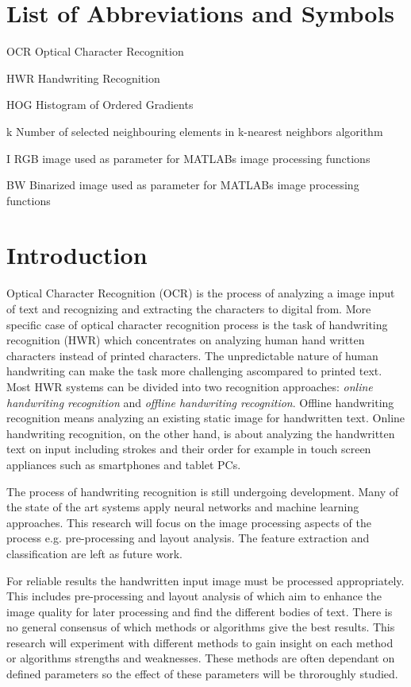 \documentclass{article}
\begin{document}
   \section*{List of Abbreviations and Symbols}

   \begin{abbrv}
    \item[OCR] Optical Character Recognition
    \item[HWR] Handwriting Recognition
    \item[HOG] Histogram of Ordered Gradients
    \item[k] Number of selected neighbouring elements in k-nearest neighbors algorithm
    \item[I] RGB image used as parameter for MATLABs image processing functions
    \item[BW] Binarized image used as parameter for MATLABs image processing functions
   \end{abbrv}

   \newpage
   \section{Introduction}
    Optical Character Recognition (OCR) is the process of analyzing a image input of  text and recognizing and extracting the characters to digital from. More specific case of optical character recognition process is the task of handwriting recognition (HWR) which concentrates on analyzing human hand written characters instead of printed characters. The unpredictable nature of human handwriting can make the task more challenging ascompared to printed text. Most HWR systems can be divided into two recognition approaches: \textit{online handwriting recognition} and \textit{offline handwriting recognition}. Offline handwriting recognition means analyzing an existing static image for handwritten text. Online handwriting recognition, on the other hand, is about analyzing the handwritten text on input including strokes and their order for example in touch screen appliances such as smartphones and tablet PCs.

    The process of handwriting recognition is still undergoing development. Many of the state of the art systems apply neural networks and machine learning approaches. This research will focus on the image processing aspects of the process e.g. pre-processing and layout analysis. The feature extraction and classification are left as future work.

    For reliable results the handwritten input image must be processed appropriately. This includes pre-processing and layout analysis of which aim to enhance the image quality for later processing and find the different bodies of text. There is no general consensus of which methods or algorithms give the best results. This research will experiment with different methods to gain insight on each method or algorithms strengths and weaknesses. These methods are often dependant on defined parameters so the effect of these parameters will be throroughly studied.
\end{document}
